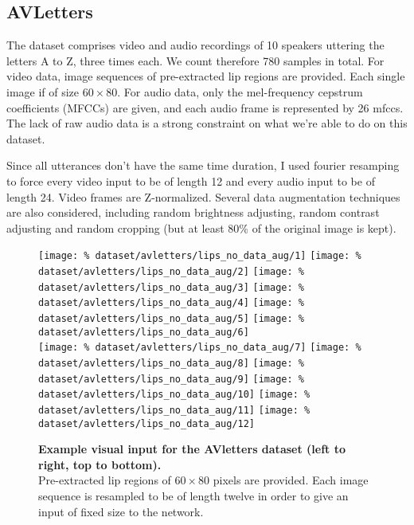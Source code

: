 \subsection{AVLetters}

The dataset comprises video and audio recordings of 10 speakers
uttering the letters A to Z, three times each.
We count therefore 780 samples in total. For video data, image sequences
of pre-extracted lip regions are provided.
Each single image if of size $60 \times 80$.
For audio data, only the mel-frequency cepstrum coefficients (MFCCs)
are given, and each audio frame is represented by 26 mfccs.
The lack of raw audio data is a strong constraint on what we're able to do
on this dataset.

Since all utterances don't have the same time duration, I used
fourier resamping to force every video input to be of length 12 and
every audio input to be of length 24. Video frames are Z-normalized.
Several data augmentation techniques
are also considered, including random brightness adjusting, random contrast
adjusting and random cropping (but at least 80\% of the original image
is kept).

\begin{figure}[H]
  \centering
  \texttt{[image: \%
    dataset/avletters/lips\_no\_data\_aug/1]}
  \texttt{[image: \%
    dataset/avletters/lips\_no\_data\_aug/2]}
  \texttt{[image: \%
    dataset/avletters/lips\_no\_data\_aug/3]}
  \texttt{[image: \%
    dataset/avletters/lips\_no\_data\_aug/4]}
  \texttt{[image: \%
    dataset/avletters/lips\_no\_data\_aug/5]}
  \texttt{[image: \%
    dataset/avletters/lips\_no\_data\_aug/6]}\\[0.15em]
  \texttt{[image: \%
    dataset/avletters/lips\_no\_data\_aug/7]}
  \texttt{[image: \%
    dataset/avletters/lips\_no\_data\_aug/8]}
  \texttt{[image: \%
    dataset/avletters/lips\_no\_data\_aug/9]}
  \texttt{[image: \%
    dataset/avletters/lips\_no\_data\_aug/10]}
  \texttt{[image: \%
    dataset/avletters/lips\_no\_data\_aug/11]}
  \texttt{[image: \%
    dataset/avletters/lips\_no\_data\_aug/12]}
  \caption{%
    \textbf{Example visual input for the AVletters dataset
      (left to right, top to bottom).}\\[0.1em]
    Pre-extracted lip regions of $60 \times 80$ pixels are provided.
      Each image sequence is resampled to be of length twelve in order to
      give an input of fixed size to the network.}
  \label{fig:avletters_exs}
\end{figure}

